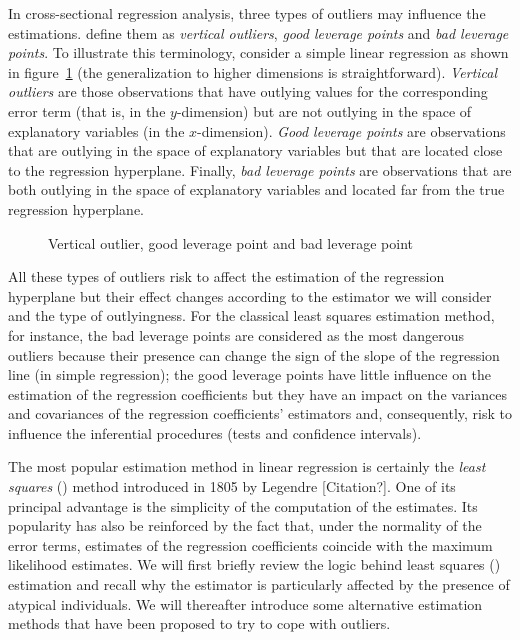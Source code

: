 In cross-sectional regression analysis, three types of outliers may influence
the estimations. \citet{rousseeuw:leroy:1987} define them as \emph{vertical
outliers}, \emph{good leverage points} and \emph{bad leverage points}. To
illustrate this terminology, consider a simple linear regression as shown in
figure~\ref{fig:outlier_types} (the generalization to higher dimensions is
straightforward). \emph{Vertical outliers} are those observations that have
outlying values for the corresponding error term (that is, in the
$y$-dimension) but are not outlying in the space of explanatory variables (in
the $x$-dimension). \emph{Good leverage points} are observations that are
outlying in the space of explanatory variables but that are located close to
the regression hyperplane. Finally, \emph{bad leverage points} are observations
that are both outlying in the space of explanatory variables and located far
from the true regression hyperplane.


\begin{figure}[h!]
    \centering
    \caption{Vertical outlier, good leverage point and bad leverage point}
    \label{fig:outlier_types}
\end{figure}

All these types of outliers risk to affect the estimation of the regression
hyperplane but their effect changes according to the estimator we will
consider and the type of outlyingness. For the classical least squares
estimation method, for instance, the bad leverage points are considered as the
most dangerous outliers because their presence can change the sign of the
slope of the regression line (in simple regression); the good leverage points
have little influence on the estimation of the regression coefficients but
they have an impact on the variances and covariances of the regression
coefficients' estimators and, consequently, risk to influence the inferential
procedures (tests and confidence intervals).

The most popular estimation method in linear regression is certainly the
\emph{least squares} () method introduced in 1805 by Legendre
\alert{[Citation?]}. One of its principal advantage is the simplicity of the
computation of the  estimates. Its popularity has also be reinforced
by the fact that, under the normality of the error terms,  estimates
of the regression coefficients coincide with the maximum likelihood estimates.
We will first briefly review the logic behind least squares ()
estimation and recall why the  estimator is particularly affected by
the presence of atypical individuals. We will thereafter introduce some
alternative estimation methods that have been proposed to try to cope with
outliers.


